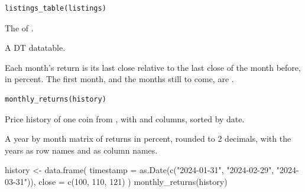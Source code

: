 \documentclass[a4paper]{book}
\begin{document}
%
\begin{Usage}
\begin{verbatim}
listings_table(listings)
\end{verbatim}
\end{Usage}
%
\begin{Arguments}
\begin{ldescription}
\item[\code{listings}] The  of .
\end{ldescription}
\end{Arguments}
%
\begin{Value}
A DT datatable.
\end{Value}
%
\begin{Examples}
\end{Examples}
%
\begin{Description}
Each month's return is its last close relative to the last close of the
month before, in percent. The first month, and the months still to come,
are .
\end{Description}
%
\begin{Usage}
\begin{verbatim}
monthly_returns(history)
\end{verbatim}
\end{Usage}
%
\begin{Arguments}
\begin{ldescription}
\item[\code{history}] Price history of one coin from , with
 and  columns, sorted by date.
\end{ldescription}
\end{Arguments}
%
\begin{Value}
A year by month matrix of returns in percent, rounded to 2
decimals, with the years as row names and  as column names.
\end{Value}
%
\begin{Examples}
\begin{ExampleCode}
history <- data.frame(
  timestamp = as.Date(c("2024-01-31", "2024-02-29", "2024-03-31")),
  close = c(100, 110, 121)
)
monthly_returns(history)
\end{ExampleCode}
\end{Examples}
\end{document}

